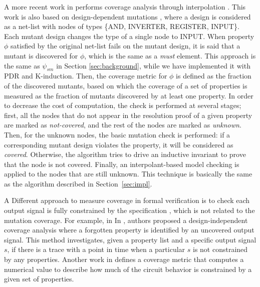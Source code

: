 A more recent work in \cite{chockler2010coverage} performs coverage analysis through interpolation \cite{mcmillan2003interpolation}. This work is also based on design-dependent mutations \cite{chockler_coverage_2003}, where a design is considered as a net-list with nodes of types \{AND, INVERTER, REGISTER, INPUT\}. Each mutant design changes the type of a single node to INPUT. When property $\phi$ satisfied by the original net-list fails on the mutant design, it is said that a mutant is discovered for $\phi$, which is the same as a \emph{must} element. This approach is the same as $\psi_{sm}$ in Section \ref{sec:background}, while we have implemented it with PDR and K-induction.
Then, the coverage metric for $\phi$ is defined as the fraction of the discovered mutants, based on which the coverage of a set of properties is measured as the fraction of mutants discovered by at least one property.
In order to decrease the cost of computation, the check is performed at several stages; first, all the nodes that do not appear in the resolution proof of a given property are marked as \emph{not-covered}, and the rest of the nodes are marked as \emph{unknown}. Then, for the unknown nodes, the basic mutation check is performed: if a corresponding mutant design violates the property, it will be considered as \emph{covered}. Otherwise, the algorithm tries to drive an inductive invariant to prove that the node is not covered. Finally, an interpolant-based model checking is applied to the nodes that are still unknown. This technique is basically the same as the \mustalg algorithm described in Section~\ref{sec:impl}.

A Different approach to measure coverage in formal verification is to check each output signal is fully constrained by the specification \cite{das2005formal, claessen2007coverage, grosse2007estimating}, which is not related to the mutation coverage. For example, in In \cite{claessen2007coverage}, authors proposed a design-independent coverage analysis where a forgotten property is identified by an uncovered output signal. This method investigates, given a property list and a specific output signal $s$, if there is a trace with a point in time when a particular $s$ is not constrained by any properties. Another work in \cite{haedicke2012guiding} defines a coverage metric that computes a numerical value to describe how much of the circuit behavior is constrained by a given set of properties.


